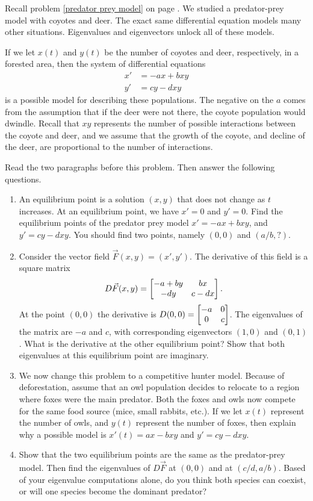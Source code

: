 \mysubsection{\ideanon}



Recall problem \ref{predator prey model} on page \pageref{predator prey model}.  We studied a predator-prey model with coyotes and deer.  
The exact same differential equation models many other situations.
Eigenvalues and eigenvectors unlock all of these models. 

If we let $x(t)$ and $y(t)$ be the number of coyotes and deer, respectively, in a forested area, then the system of differential equations
\begin{align*}
x' &=-ax+bxy\\
y' &= cy-dxy
\end{align*}
is a possible model for describing these populations.  The negative on the $a$ comes from the assumption that if the deer were not there, the coyote population would dwindle. Recall that $xy$ represents the number of possible interactions between the coyote and deer, and we assume that the growth of the coyote, and decline of the deer, are proportional to the number of interactions.

\begin{problem}
Read the two paragraphs before this problem. Then answer the following questions.
\begin{enumerate}
 \item An equilibrium point is a solution $(x,y)$ that does not change as $t$ increases. At an equilibrium point, we have $x'=0$ and $y'=0$.  Find the equilibrium points of the predator prey model $x' =-ax+bxy$, and $y' = cy-dxy$.  You should find two points, namely $(0,0)$ and $(a/b,?)$.
 \item Consider the vector field $\vec F(x,y)= (x',y')$. The derivative of this field is a square matrix
$$D\vec F(x,y) = \begin{bmatrix} -a+by&bx\\ -dy & c-dx \end{bmatrix}.$$ At the point $(0,0)$ the derivative is $D(0,0)=\begin{bmatrix} -a&0\\ 0&c \end{bmatrix}$. The eigenvalues of the matrix are $-a$ and $c$, with corresponding eigenvectors $(1,0)$ and $(0,1)$.    
What is the derivative at the other equilibrium point? Show that both eigenvalues at this equilibrium point are imaginary. 
 \item We now change this problem to a competitive hunter model. Because of deforestation, assume that an owl population decides to relocate to a region where foxes were the main predator.  Both the foxes and owls now compete for the same food source (mice, small rabbits, etc.).  If we let $x(t)$ represent the number of owls, and $y(t)$ represent the number of foxes, then explain why a possible model is $x'(t)=ax-bxy$ and $y'=cy-dxy$.  
\item Show that the two equilibrium points are the same as the predator-prey model.  Then find the eigenvalues of $D\vec F$ at $(0,0)$ and at $(c/d,a/b)$. Based of your eigenvalue computations alone, do you think both species can coexist, or will one species become the dominant predator?
\end{enumerate}
 \end{problem}




